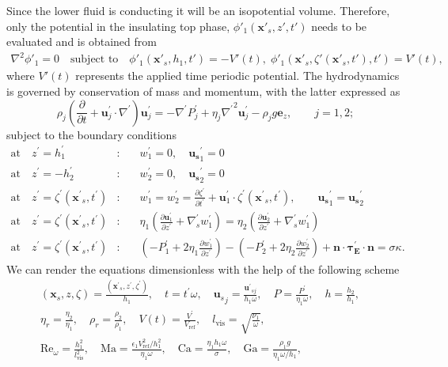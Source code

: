 \documentclass{jfm_arxiv}
\newcommand{\xs}{\mathbf{x}_s}
\newcommand{\xsp}{\mathbf{x^\prime}_s}
\newcommand{\zp}{z^\prime}
\newcommand{\tp}{t^\prime}
\newcommand{\nablap}{\nabla^\prime}
\newcommand{\zetap}{\zeta^\prime}
\newcommand{\us}{\mathbf{u}_s}
\newcommand{\up}{\mathbf{u}^\prime}
\newcommand{\Pp}{P^\prime}
\newcommand{\Ma}{\text{Ma}}
\newcommand{\Ca}{\text{Ca}}
\newcommand{\Ga}{\text{Ga}}
\renewcommand{\Re}{\text{Re}_\omega}
\begin{document}
Since the lower fluid is conducting it will be an isopotential volume. Therefore, only the potential in the insulating top phase, $\phi'_1 (\mathbf{x}'_s, z', t')$ needs to be evaluated and is obtained from
\begin{eqnarray}
\nabla^2\phi'_1 = 0\quad \textrm{subject to} \quad \phi'_1(\mathbf{x}'_s, h_1, t') = -V'(t), \; \phi'_1(\mathbf{x}'_s, \zeta'(\mathbf{x}'_s,t'), t') = V'(t),
\end{eqnarray}
where $V'(t)$ represents the applied time periodic potential. The hydrodynamics is governed by conservation of mass and momentum, with the latter expressed as
\begin{equation}
   \rho_j \left( \frac{\partial }{\partial t} + \up_j\cdot\nablap \right) \up_j = -\nablap \Pp_j+\eta_j{\nablap}^2\up_j-\rho_jg{\mathbf{e}_z}, \qquad j = 1,2;
\end{equation}
subject to the boundary conditions
\begin{eqnarray}
  \text{at} \quad \zp = h_1^\prime &:& \quad w_1^\prime = 0, \quad {\mathbf{u_s}}_1^\prime = 0 \\
  \text{at} \quad \zp = -h_2^\prime &:& \quad w_2^\prime = 0, \quad {\mathbf{u_s}}_2^\prime = 0 \\
  \text{at} \quad \zp = \zetap(\xsp,\tp) &:&\quad  w_1^\prime = w_2^\prime = \frac{\partial \zetap}{\partial \tp} + \up_1\cdot \zetap(\xsp,\tp), \qquad {\mathbf{u_s}}_1^\prime = {\mathbf{u_s}}_2^\prime\\
\text{at}\quad \zp = \zetap(\xsp,\tp) &:& \quad  \eta_1\left(\frac{\partial \up_1}{\partial \zp} + \nablap_sw_1^\prime \right)
  =\eta_2 \left(\frac{\partial \up_2}{\partial \zp} + \nablap_sw_1^\prime \right)\\
  \text{at}\quad \zp = \zetap(\xsp,\tp) &:& \quad \left(-\Pp _1 + 2\eta_1 \frac{\partial w_1^\prime}{\partial \zp}\right) - \left(-\Pp_2 + 2\eta_2 \frac{\partial w_2^\prime}{\partial \zp}\right) + {\mathbf{n}}\cdot{\mathbf{\tau_E^\prime}}\cdot{\mathbf{n}} = \sigma \kappa.
\end{eqnarray}
We can render the equations dimensionless with the help of the following scheme 
\begin{equation}
\begin{gathered}
  (\xs,z,\zeta) = \frac{(\xsp,\zp,\zetap)}{h_1},\quad
  t = \tp \omega, \quad
  {\us}_j = \frac{{\up}_{sj}}{h_1\omega},\quad
  P = \frac{\Pp}{\eta_1 \omega},\quad
  h = \frac{h_2}{h_1},\quad \\
  \eta_r = \frac{\eta_2}{\eta_1}, \quad
  \rho_r = \frac{\rho_2}{\rho_1}, \quad
  V(t) = \frac{V^\prime}{V_\text{ref}}, \quad
  l_\text{vis} = \sqrt{\frac{\nu_1}{\omega}}, \quad \\
  \Re = \frac{h_1^2}{l_\text{vis}^2}, \quad
  \Ma = \frac{\epsilon_1 V_\text{ref}^2/h_1^2}{\eta_1 \omega}, \quad 
  \Ca = \frac{\eta_1h_1\omega}{\sigma},\quad
  \Ga = \frac{\rho_1 g}{\eta_1\omega/h_1},
\end{gathered}
\end{equation}
\end{document}
